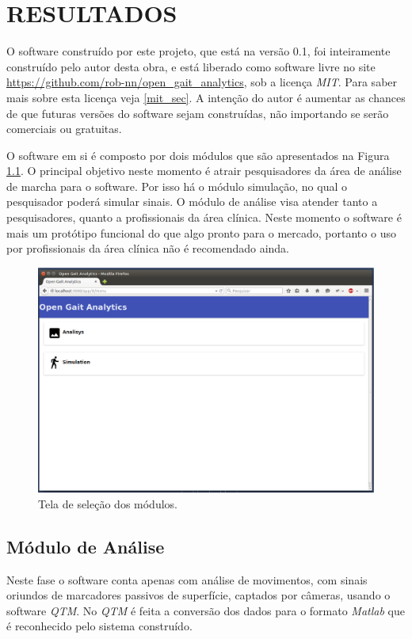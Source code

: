 \chapter[RESULTADOS]{\textbf {RESULTADOS}}

O software construído por este projeto, que está na versão 0.1, foi inteiramente construído pelo autor desta obra, e está liberado como software livre no site \url{https://github.com/rob-nn/open_gait_analytics}, sob a licença \emph{MIT}. Para saber mais sobre esta licença veja \ref{mit_sec}.
A intenção do autor é aumentar as chances de que futuras versões do software sejam construídas, não importando se serão comerciais ou gratuitas.

O software em si é composto por dois módulos que são apresentados na Figura \ref{tela1}. O principal objetivo neste momento é atrair pesquisadores da área de análise de marcha para o software. Por isso há o módulo simulação, no qual o pesquisador poderá simular sinais.
O módulo de análise visa atender tanto a pesquisadores, quanto a profissionais da área clínica. Neste momento o software é mais um protótipo funcional do que algo pronto para o mercado, portanto o uso por profissionais da área clínica não é recomendado ainda.

\begin{figure}[ht]
	\centering
	\includegraphics[width=15cm]{figuras/tela1.eps}
	\caption{Tela de seleção dos módulos.}
	\label{tela1}
\end{figure}

\section{Módulo de Análise}
Neste fase o software conta apenas com análise de movimentos, com sinais oriundos de marcadores passivos de superfície, captados por câmeras, usando o software \emph{QTM}. 
No \emph{QTM} é feita a conversão dos dados para o formato \emph{Matlab} que é reconhecido pelo sistema construído.

